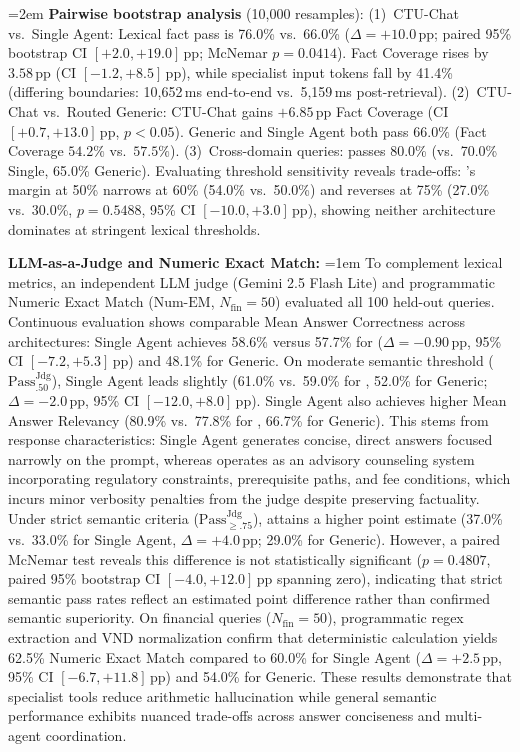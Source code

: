 \pagebreak[4]
\begingroup\emergencystretch=2em
\textbf{Pairwise bootstrap analysis} (10,000 resamples):
(1)~CTU-Chat vs.\ Single Agent: Lexical fact pass is 76.0\% vs.\ 66.0\% ($\Delta{=}+10.0$\,pp; paired 95\% bootstrap CI $[+2.0, +19.0]$\,pp; McNemar $p{=}0.0414$). Fact Coverage rises by $3.58$\,pp (CI $[-1.2, +8.5]$\,pp), while specialist input tokens fall by 41.4\% (differing boundaries: 10{,}652\,ms end-to-end vs.\ 5{,}159\,ms post-retrieval).
(2)~CTU-Chat vs.\ Routed Generic: CTU-Chat gains $+6.85$\,pp Fact Coverage (CI $[+0.7, +13.0]$\,pp, $p{<}0.05$). Generic and Single Agent both pass $66.0\%$ (Fact Coverage $54.2\%$ vs.\ $57.5\%$).
(3)~Cross-domain queries: \system{} passes 80.0\% (vs.\ 70.0\% Single, 65.0\% Generic).
Evaluating threshold sensitivity reveals trade-offs: \system{}'s margin at 50\% narrows at 60\% (54.0\% vs.\ 50.0\%) and reverses at 75\% (27.0\% vs.\ 30.0\%, $p{=}0.5488$, 95\% CI $[-10.0, +3.0]$\,pp), showing neither architecture dominates at stringent lexical thresholds.
\par\endgroup

\textbf{LLM-as-a-Judge and Numeric Exact Match:}
\begingroup\emergencystretch=1em
To complement lexical metrics, an independent LLM judge (Gemini 2.5 Flash Lite) and programmatic Numeric Exact Match ($\text{Num-EM}$, $N_{\text{fin}}{=}50$) evaluated all 100 held-out queries. Continuous evaluation shows comparable Mean Answer Correctness across architectures: Single Agent achieves 58.6\% versus 57.7\% for \system{} ($\Delta = -0.90$\,pp, 95\% CI $[-7.2, +5.3]$\,pp) and 48.1\% for Generic. On moderate semantic threshold ($\text{Pass}_{.50}^{\text{Jdg}}$), Single Agent leads slightly (61.0\% vs.\ 59.0\% for \system{}, 52.0\% for Generic; $\Delta = -2.0$\,pp, 95\% CI $[-12.0, +8.0]$\,pp). Single Agent also achieves higher Mean Answer Relevancy (80.9\% vs.\ 77.8\% for \system{}, 66.7\% for Generic). This stems from response characteristics: Single Agent generates concise, direct answers focused narrowly on the prompt, whereas \system{} operates as an advisory counseling system incorporating regulatory constraints, prerequisite paths, and fee conditions, which incurs minor verbosity penalties from the judge despite preserving factuality. Under strict semantic criteria ($\text{Pass}_{\ge .75}^{\text{Jdg}}$), \system{} attains a higher point estimate (37.0\% vs.\ 33.0\% for Single Agent, $\Delta = +4.0$\,pp; 29.0\% for Generic). However, a paired McNemar test reveals this difference is not statistically significant ($p{=}0.4807$, paired 95\% bootstrap CI $[-4.0, +12.0]$\,pp spanning zero), indicating that strict semantic pass rates reflect an estimated point difference rather than confirmed semantic superiority. On financial queries ($N_{\text{fin}}{=}50$), programmatic regex extraction and VND normalization confirm that deterministic calculation yields 62.5\% Numeric Exact Match compared to 60.0\% for Single Agent ($\Delta = +2.5$\,pp, 95\% CI $[-6.7, +11.8]$\,pp) and 54.0\% for Generic. These results demonstrate that specialist tools reduce arithmetic hallucination while general semantic performance exhibits nuanced trade-offs across answer conciseness and multi-agent coordination.
\par\endgroup

